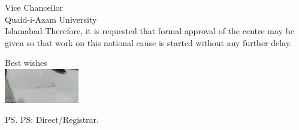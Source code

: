 \documentclass[11pt,a4paper,]{letter}
\begin{document}
\begin{letter}{Vice Chancellor\\Quaid-i-Azam University\\Islamabad}
Therefore, it is requested that formal approval of the centre may be
given so that work on this national cause is started without any further
delay.
\closing{Best
wishes\\[0.2cm]\hspace*{0.5cm}\includegraphics[height=1.5cm]{sigfile.jpg}}
\ps{PS: Direct/Registrar.}
\end{letter}
\end{document}
